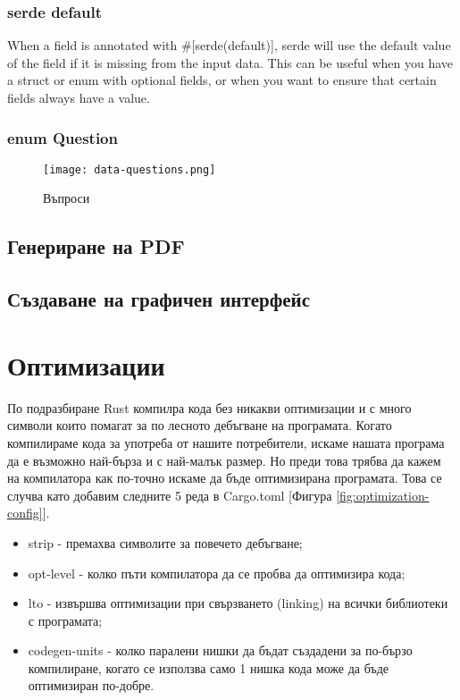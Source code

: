 \subsubsection{serde default}
When a field is annotated with \#[serde(default)], serde will use the default
value of the field if it is missing from the input data. This can be useful
when you have a struct or enum with optional fields, or when you want to ensure
that certain fields always have a value.


\subsubsection{enum Question}
\begin{figure}[!htb]
  \texttt{[image: data-questions.png]}
  \centering
  \caption{Въпроси}
  \label{fig:data-questions}
\end{figure}

\subsection{Генериране на PDF}
\subsection{Създаване на графичен интерфейс}

\section{Оптимизации}
По подразбиране Rust компилра кода без никакви оптимизации и с много символи
които помагат за по лесното дебъгване на програмата. Когато компилираме кода
за употреба от нашите потребители, искаме нашата програма да е възможно
най-бърза и с най-малък размер. Но преди това трябва да кажем на компилатора
как по-точно искаме да бъде оптимизирана програмата. Това се случва като добавим
следните 5 реда в Cargo.toml [Фигура \ref{fig:optimization-config}].
\begin{itemize}
    \item strip - премахва символите за повечето дебъгване;
    \item opt-level - колко пъти компилатора да се пробва да оптимизира кода;
    \item lto - извършва оптимизации при свързването (linking) на всички библиотеки с програмата;
    \item codegen-units - колко паралени нишки да бъдат създадени за по-бързо компилиране, когато се използва само 1 нишка кода може да бъде оптимизиран по-добре.
\end{itemize}

